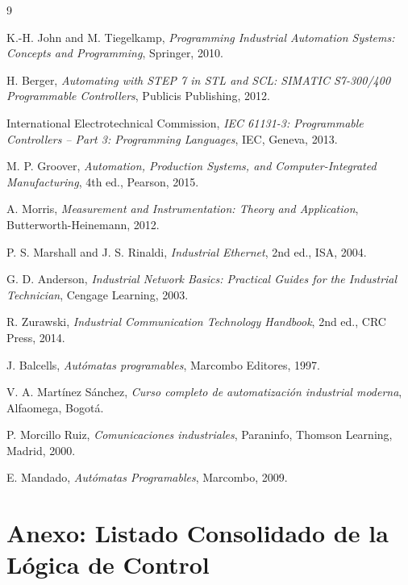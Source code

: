 \documentclass[conference]{IEEEtran}
\begin{document}

\begin{thebibliography}{9}

K.-H. John and M. Tiegelkamp, \textit{Programming Industrial Automation Systems: Concepts and Programming}, Springer, 2010.

H. Berger, \textit{Automating with STEP 7 in STL and SCL: SIMATIC S7-300/400 Programmable Controllers}, Publicis Publishing, 2012.

International Electrotechnical Commission, \textit{IEC 61131-3: Programmable Controllers -- Part 3: Programming Languages}, IEC, Geneva, 2013.

M. P. Groover, \textit{Automation, Production Systems, and Computer-Integrated Manufacturing}, 4th ed., Pearson, 2015.

A. Morris, \textit{Measurement and Instrumentation: Theory and Application}, Butterworth-Heinemann, 2012.

P. S. Marshall and J. S. Rinaldi, \textit{Industrial Ethernet}, 2nd ed., ISA, 2004.

G. D. Anderson, \textit{Industrial Network Basics: Practical Guides for the Industrial Technician}, Cengage Learning, 2003.

R. Zurawski, \textit{Industrial Communication Technology Handbook}, 2nd ed., CRC Press, 2014.

J. Balcells, \textit{Autómatas programables}, Marcombo Editores, 1997.

V. A. Martínez Sánchez, \textit{Curso completo de automatización industrial moderna}, Alfaomega, Bogotá.

P. Morcillo Ruiz, \textit{Comunicaciones industriales}, Paraninfo, Thomson Learning, Madrid, 2000.

E. Mandado, \textit{Autómatas Programables}, Marcombo, 2009.

\end{thebibliography}

\section*{Anexo: Listado Consolidado de la Lógica de Control}
\end{document}
